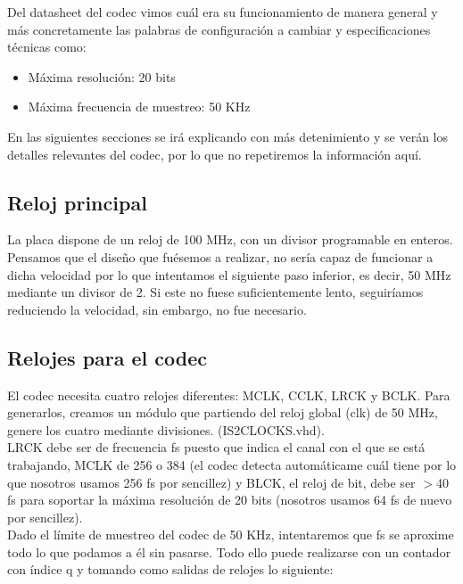 	Del datasheet del codec vimos cuál era su funcionamiento de  manera general y más concretamente las palabras de configuración a cambiar y especificaciones técnicas como:

	\begin{itemize}
		\item Máxima resolución: 20 bits
		\item Máxima frecuencia de muestreo: 50 KHz
		
	\end{itemize}

	En las siguientes secciones se irá explicando con más detenimiento y se verán los detalles relevantes del codec, por lo que no repetiremos la información aquí.


	\subsection{Reloj principal}
		La placa dispone de un reloj de 100 MHz, con un divisor programable en enteros. Pensamos que el diseño que fuésemos a realizar, no sería capaz de funcionar a dicha velocidad por lo que intentamos el siguiente paso inferior, es decir, 50 MHz mediante un divisor de 2. Si este no fuese suficientemente lento, seguiríamos reduciendo la velocidad, sin embargo, no fue necesario.\\
		


	\subsection{Relojes para el codec}

		El codec necesita cuatro relojes diferentes: MCLK, CCLK, LRCK y BCLK. Para generarlos, creamos un módulo que partiendo del reloj global (clk) de 50 MHz, genere los cuatro mediante divisiones. (IS2CLOCKS.vhd).\\
		

		LRCK debe ser de frecuencia fs puesto que indica el canal con el que se está trabajando, MCLK de 256 o 384 (el codec detecta automáticame cuál tiene por lo que nosotros usamos 256 fs por sencillez) y BLCK, el reloj de bit, debe ser $>$40 fs para soportar la máxima resolución de 20 bits (nosotros usamos 64 fs de nuevo por sencillez).\\

		Dado el límite de muestreo del codec de 50 KHz, intentaremos que fs se aproxime todo lo que podamos a él sin pasarse. Todo ello puede realizarse con un contador con índice q y tomando como salidas de relojes lo siguiente:

